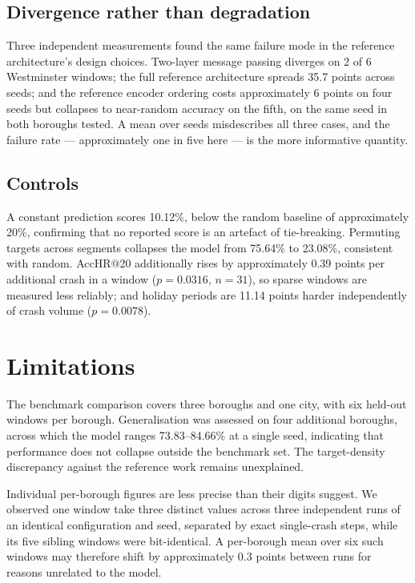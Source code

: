 \documentclass[conference]{IEEEtran}
\begin{document}
\subsection{Divergence rather than degradation}

Three independent measurements found the same failure mode in the
reference architecture's design choices. Two-layer message passing
diverges on 2 of 6 Westminster windows; the full reference architecture
spreads 35.7 points across seeds; and the reference encoder ordering costs
approximately 6 points on four seeds but collapses to near-random accuracy
on the fifth, on the same seed in both boroughs tested. A mean over seeds
misdescribes all three cases, and the failure rate --- approximately one
in five here --- is the more informative quantity.

\subsection{Controls}

A constant prediction scores 10.12\%, below the random baseline of
approximately 20\%, confirming that no reported score is an artefact of
tie-breaking. Permuting targets across segments collapses the model from
75.64\% to 23.08\%, consistent with random. AccHR@20 additionally rises by
approximately 0.39 points per additional crash in a window ($p=0.0316$,
$n=31$), so sparse windows are measured less reliably; and holiday periods
are 11.14 points harder independently of crash volume ($p=0.0078$).

\section{Limitations}

The benchmark comparison covers three boroughs and one city, with six
held-out windows per borough. Generalisation was assessed on four
additional boroughs, across which the model ranges 73.83--84.66\% at a
single seed, indicating that performance does not collapse outside the
benchmark set. The target-density discrepancy against the reference work
remains unexplained.

Individual per-borough figures are less precise than their digits suggest.
We observed one window take three distinct values across three independent
runs of an identical configuration and seed, separated by exact
single-crash steps, while its five sibling windows were bit-identical. A
per-borough mean over six such windows may therefore shift by
approximately 0.3 points between runs for reasons unrelated to the model.
\end{document}
